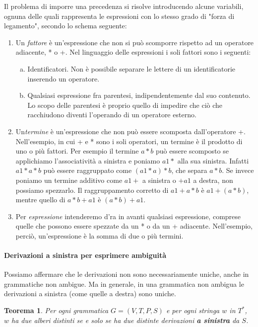\documentclass[11pt]{article}
\newtheorem{ambiguitaSinistra}{Teorema}
\begin{document}
Il problema di imporre una precedenza si risolve introducendo alcune variabili, ognuna delle quali rappresenta le espressioni con lo stesso grado di "forza di legamento", secondo lo schema seguente:
\begin{enumerate}
	\item Un \textit{fattore} è un'espressione che non si può scomporre rispetto ad un operatore adiacente, * o +. Nel linguaggio delle espressioni i soli fattori sono i seguenti:
	\begin{enumerate}[(a)]
		\item Identificatori. Non è possibile separare le lettere di un identificatorie inserendo un operatore.
		\item Qualsiasi espressione fra parentesi, indipendentemente dal suo contenuto. Lo scopo delle parentesi è proprio quello di impedire che ciò che racchiudono diventi l'operando di un operatore esterno.
	\end{enumerate}
	\item Un\textit{termine} è un'espressione che non può essere scomposta dall'operatore +. Nell'esempio, in cui + e * sono i soli operatori, un termine è il prodotto di uno o più fattori. Per esempio il termine $a*b$ può essere scomposto se applichiamo l'associatività a sinistra e poniamo $a1 *$ alla sua sinistra. Infatti $a1*a*b$ può essere raggruppato come $(a1*a)*b$, che separa $a*b$. Se invece poniamo un termine additivo come $a1+ $ a sinistra o $+a1$ a destra, non possiamo spezzarlo. Il raggruppamento corretto di $a1+a*b$ è $a1+(a*b)$, mentre quello di $a*b+a1$ è $(a*b)+a1$.
	\item Per \textit{espressione} intenderemo d'ra in avanti qualsiasi espressione, comprese quelle che possono essere spezzate da un * o da un + adiacente. Nell'esempio, perciò, un'espressione è la somma di due o più termini. 
\end{enumerate}

\paragraph{Derivazioni a sinistra per esprimere ambiguità} Possiamo affermare che le derivazioni non sono necessariamente uniche, anche in grammatiche non ambigue. Ma in generale, in una grammatica non ambigua le derivazioni a sinistra (come quelle a destra) sono uniche.

\begin{ambiguitaSinistra}
Per ogni grammatica $G=(V,T,P,S)$ e per ogni stringa $w$ in $T^*$, $w$ ha due alberi distinti se e solo se ha due distinte derivazioni \textbf{a sinistra} da $S$.
\end{ambiguitaSinistra}
\end{document}
